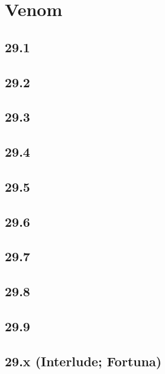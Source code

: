 \part{Venom}
 \chapter{29.1}
 \chapter{29.2}
 \chapter{29.3}
 \chapter{29.4}
 \chapter{29.5}
 \chapter{29.6}
 \chapter{29.7}
 \chapter{29.8}
 \chapter{29.9}
 \chapter{29.x (Interlude; Fortuna)}











